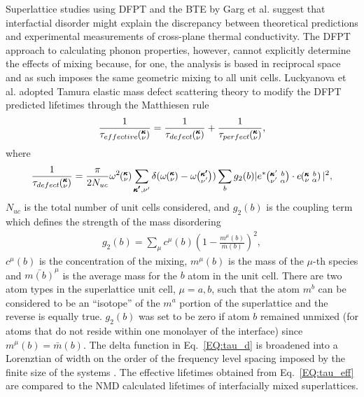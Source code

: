 \documentclass[aps,prb,preprint,preprintnumbers,amsmath,amssymb,floatfix,superscriptaddress]{revtex4}
\newcommand{\kvba}{\mspace{-4.0mu}\left(\mspace{-8.0mu}
\begin{smallmatrix} &\pmb{\kappa} &b \\ &\nu &\alpha\end{smallmatrix}
\mspace{-3.0mu}\right)}
\newcommand{\kvbap}{\mspace{-4.0mu}\left(\mspace{-8.0mu}
\begin{smallmatrix} &\pmb{\kappa}' &b \\ &\nu' &\alpha\end{smallmatrix}
\mspace{-3.0mu}\right)}
\newcommand{\kv}{\mspace{-4.0mu}\left(\mspace{-8.0mu}
\begin{smallmatrix}&\pmb{\kappa} \\&\nu\end{smallmatrix}
\mspace{-3.0mu}\right)}
\newcommand{\kvp}{\mspace{-4.0mu}\left(\mspace{-8.0mu}
\begin{smallmatrix}&\pmb{\kappa'} \\&\nu'\end{smallmatrix}
\mspace{-3.0mu}\right)}
\begin{document}
Superlattice studies using DFPT and the BTE by Garg et al. \cite{doi:10.1021/nl202186y} suggest that interfactial disorder might explain the discrepancy between theoretical predictions and experimental measurements of cross-plane thermal conductivity. The DFPT approach to calculating phonon properties, however, cannot explicitly determine the effects of mixing because, for one, the analysis is based in reciprocal space and as such imposes the same geometric mixing to all unit cells. Luckyanova et al. \cite{Luckyanova16112012} adopted Tamura elastic mass defect scattering theory \cite{tamura_isotope_1983} to modify the DFPT predicted lifetimes through the Matthiesen rule
\begin{equation}\label{EQ:tau_eff}
\begin{split}
\frac{1}{\tau_{effective}\kv} = \frac{1}{\tau_{defect}\kv}+\frac{1}{\tau_{perfect}\kv} ,
\end{split}
\end{equation}
where
\begin{equation}\label{EQ:tau_d}
\begin{split}
\frac{1}{\tau_{defect}\kv} = \frac{\pi}{2N_{uc}}\omega^2\kv 
\sum_{\pmb{\kappa'},\nu'} \delta( \omega\kv - \omega\kvp )\sum_{b} g_2(b) 
|e^*\kvbap \cdot e\kvba |^2 ,
\end{split}
\end{equation}
$N_{uc}$ is the total number of unit cells considered, and $g_2(b)$ is the coupling term which defines the strength of the mass disordering
\begin{equation}\label{EQ:g(b)}
\begin{split}
g_2(b) = \sum_\mu c^{\mu}(b)\left(1-\frac{m^{\mu}(b)}{\bar{m}(b)}\right)^2, 
\end{split}
\end{equation}
$c^\mu(b)$ is the concentration of the mixing, $m^\mu(b)$ is the mass of the $\mu$-th species and $\bar{m(b)}^{\mu}$ is the average mass for the $b$ atom in the unit cell. There are two atom types in the superlattice unit cell, $\mu=a,b$, such that the atom $m^b$ can be considered to be an ``isotope'' of the $m^a$ portion of the superlattice and the reverse is equally true. $g_2(b)$ was set to be zero if atom $b$ remained unmixed (for atoms that do not reside within one monolayer of the interface) since $m^{\mu}(b)=\bar{m}(b)$. The delta function in Eq.~\ref{EQ:tau_d} is broadened into a Lorenztian of width on the order of the frequency level spacing imposed by the finite size of the systems \cite{allen_thermal_1993}. The effective lifetimes obtained from Eq.~\ref{EQ:tau_eff} are compared to the NMD calculated lifetimes of interfacially mixed superlattices.
\end{document}
